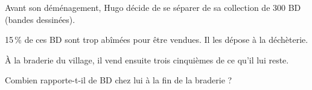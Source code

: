 
\medskip
 
Avant son déménagement, Hugo décide de se séparer de sa collection de $300$ BD (bandes
dessinées).

15\,\% de ces BD sont trop abîmées pour être vendues. Il les dépose à la déchèterie.

À la braderie du village, il vend ensuite trois cinquièmes de ce qu'il lui reste.

Combien rapporte-t-il de BD chez lui à la fin de la braderie ?

\medskip

